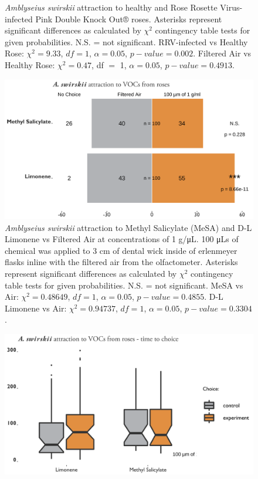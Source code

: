 \documentclass[12pt,final,CPage]{ufthesis}
\begin{document}
{\begin{figure}
{  }

  \caption{\textit{Amblyseius swirskii} attraction to healthy and Rose Rosette Virus-infected Pink Double Knock Out® roses. Asterisks represent significant differences as calculated by $\chi^2$ contingency table tests for given probabilities. N.S. = not significant. RRV-infected vs Healthy Rose: $\chi^2 = 9.33$, $df = 1$, $\alpha = 0.05$, $p-value = 0.002$. Filtered Air vs Healthy Rose: $\chi^2 = 0.47$, df $=$ 1, $\alpha = 0.05$, $p-value = 0.4913$.}\label{fig:aswir-rrd}
  \end{figure}
  \begin{figure}

  {\centering \includegraphics[width=1\linewidth]{figure/rrv_graph_olfact_vocs} 

  }

  \caption{\textit{Amblyseius swirskii} attraction to Methyl Salicylate (MeSA) and D-L Limonene vs Filtered Air at concentrations of 1 g/\si{\micro\liter}. 100 \si{\micro\liter}s of chemical was applied to 3 cm of dental wick inside of erlenmeyer flasks inline with the filtered air from the olfactometer. Asterisks represent significant differences as calculated by $\chi^2$ contingency table tests for given probabilities. N.S. = not significant. MeSA vs Air: $\chi^2 = 0.48649$, $df = 1$, $\alpha = 0.05$, $p-value = 0.4855$. D-L Limonene vs Air: $\chi^2 = 0.94737$, $df = 1$, $\alpha = 0.05$, $p-value = 0.3304$.}\label{fig:aswir-mesa-lim}
  \end{figure}
  \begin{figure}

  {\centering \includegraphics[width=1\linewidth]{figure/rrv_graph_olfact_vocs_time_choice} 

}
\end{figure}}
\end{document}
